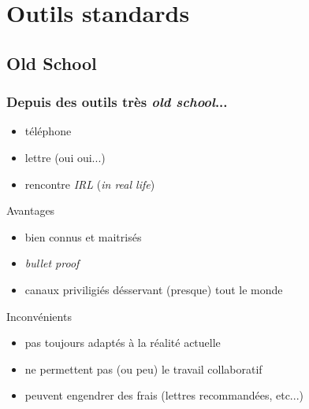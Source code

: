 \documentclass{beamer}
\begin{document}
\section{Outils standards} %

\subsection{Old School} %

\begin{frame}
    \frametitle{Depuis des outils très \textit{old school}...}

    \pause{}

    \begin{itemize}
        \item téléphone
        \item lettre (oui oui...)
        \item rencontre \textit{IRL} (\textit{in real life})
    \end{itemize}
\end{frame}

\begin{frame}
    \begin{block}{Avantages}
    \begin{itemize}
        \item bien connus et maitrisés
        \item \textit{bullet proof}
        \item canaux priviligiés désservant (presque) tout le monde
    \end{itemize}
    \end{block}

    \pause{}

    \begin{block}{Inconvénients}
    \begin{itemize}
        \item pas toujours adaptés à la réalité actuelle
        \item ne permettent pas (ou peu) le travail collaboratif
        \item peuvent engendrer des frais (lettres recommandées, etc...)
    \end{itemize}
    \end{block}

\end{frame}
\end{document}
